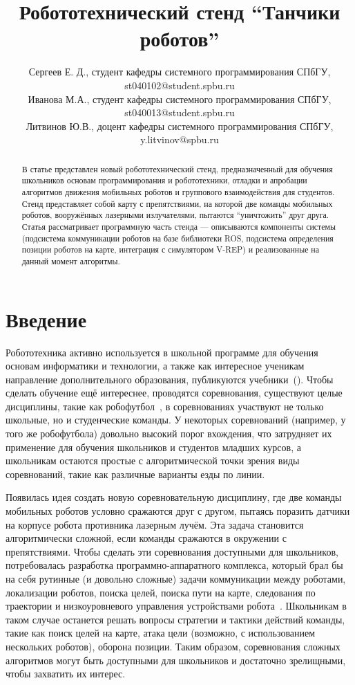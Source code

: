 \documentclass{spisok-article}
\title{Робототехнический стенд ``Танчики роботов''}
\author{
	Сергеев Е. Д.,
	студент кафедры системного программирования СПбГУ,
	st040102@student.spbu.ru

	Иванова М.А.,
	студент кафедры системного программирования СПбГУ,
	st040013@student.spbu.ru

	Литвинов Ю.В.,
	доцент кафедры системного программирования СПбГУ, 
	y.litvinov@spbu.ru
}
\begin{document}
\maketitle

\begin{abstract}
В статье представлен новый робототехнический стенд, предназначенный для обучения школьников основам программирования и робототехники, отладки и апробации алгоритмов движения мобильных роботов и группового взаимодействия для студентов. Стенд представляет собой карту с препятствиями, на которой две команды мобильных роботов, вооружённых лазерными излучателями, пытаются ``уничтожить'' друг друга. Статья рассматривает программную часть стенда --- описываются компоненты системы (подсистема коммуникации роботов на базе библиотеки ROS, подсистема определения позиции роботов на карте, интеграция с симулятором V-REP) и реализованные на данный момент алгоритмы.
\end{abstract}

\section{Введение}

Робототехника активно используется в школьной программе для обучения основам информатики и технологии, а также как интересное ученикам направление дополнительного образования, публикуются учебники~(\cite{filippov2017robots, kiselev2017robots}). Чтобы сделать обучение ещё интереснее, проводятся соревнования, существуют целые дисциплины, такие как робофутбол~\cite{luchin2012stand,luchin2012agents}, в соревнованиях участвуют не только школьные, но и студенческие команды. У некоторых соревнований (например, у того же робофутбола) довольно высокий порог вхождения, что затрудняет их применение для обучения школьников и студентов младших курсов, а школьникам остаются простые с алгоритмической точки зрения виды соревнований, такие как различные варианты езды по линии.

Появилась идея создать новую соревновательную дисциплину, где две команды мобильных роботов условно сражаются друг с другом, пытаясь поразить датчики на корпусе робота противника лазерным лучём. Эта задача становится алгоритмически сложной, если команды сражаются в окружении с препятствиями. Чтобы сделать эти соревнования доступными для школьников, потребовалась разработка программно-аппаратного комплекса, который брал бы на себя рутинные (и довольно сложные) задачи коммуникации между роботами, локализации роботов, поиска целей, поиска пути на карте, следования по траектории и низкоуровневого управления устройствами робота~\cite{siegwart2011robots}. Школьникам в таком случае останется решать вопросы стратегии и тактики действий команды, такие как поиск целей на карте, атака цели (возможно, с использованием нескольких роботов), оборона позиции. Таким образом, соревнования сложных алгоритмов могут быть доступными для школьников и достаточно зрелищными, чтобы захватить их интерес.
\end{document}
